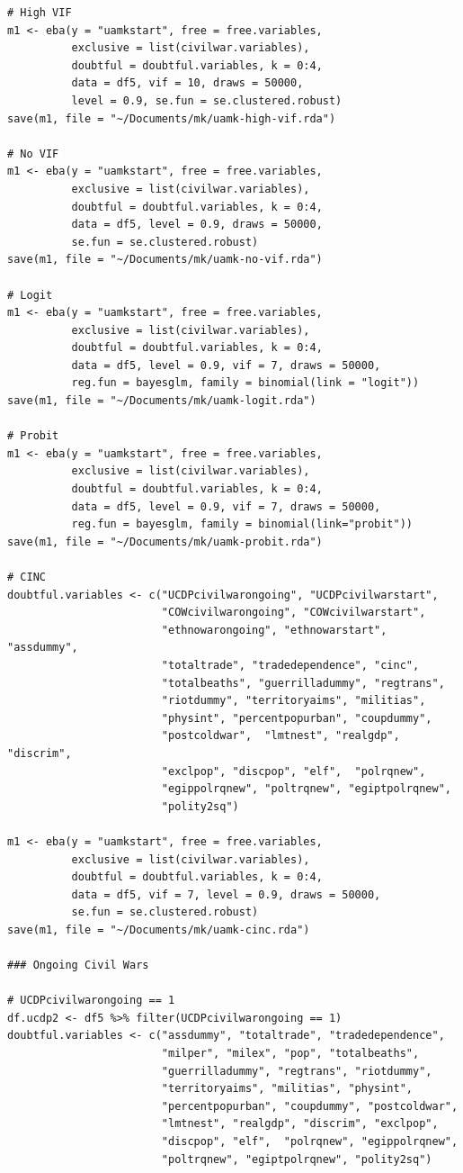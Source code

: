 \begin{verbatim}
# High VIF
m1 <- eba(y = "uamkstart", free = free.variables,
          exclusive = list(civilwar.variables),
          doubtful = doubtful.variables, k = 0:4,
          data = df5, vif = 10, draws = 50000,
          level = 0.9, se.fun = se.clustered.robust)
save(m1, file = "~/Documents/mk/uamk-high-vif.rda")

# No VIF
m1 <- eba(y = "uamkstart", free = free.variables,
          exclusive = list(civilwar.variables),
          doubtful = doubtful.variables, k = 0:4,
          data = df5, level = 0.9, draws = 50000,
          se.fun = se.clustered.robust)
save(m1, file = "~/Documents/mk/uamk-no-vif.rda")

# Logit
m1 <- eba(y = "uamkstart", free = free.variables,
          exclusive = list(civilwar.variables),
          doubtful = doubtful.variables, k = 0:4,
          data = df5, level = 0.9, vif = 7, draws = 50000,
          reg.fun = bayesglm, family = binomial(link = "logit"))
save(m1, file = "~/Documents/mk/uamk-logit.rda")

# Probit
m1 <- eba(y = "uamkstart", free = free.variables,
          exclusive = list(civilwar.variables),
          doubtful = doubtful.variables, k = 0:4,
          data = df5, level = 0.9, vif = 7, draws = 50000,
          reg.fun = bayesglm, family = binomial(link="probit"))
save(m1, file = "~/Documents/mk/uamk-probit.rda")

# CINC
doubtful.variables <- c("UCDPcivilwarongoing", "UCDPcivilwarstart",
                        "COWcivilwarongoing", "COWcivilwarstart",
                        "ethnowarongoing", "ethnowarstart", "assdummy",
                        "totaltrade", "tradedependence", "cinc",
                        "totalbeaths", "guerrilladummy", "regtrans",
                        "riotdummy", "territoryaims", "militias",
                        "physint", "percentpopurban", "coupdummy",
                        "postcoldwar",  "lmtnest", "realgdp", "discrim",
                        "exclpop", "discpop", "elf",  "polrqnew",
                        "egippolrqnew", "poltrqnew", "egiptpolrqnew",
                        "polity2sq")

m1 <- eba(y = "uamkstart", free = free.variables,
          exclusive = list(civilwar.variables),
          doubtful = doubtful.variables, k = 0:4,
          data = df5, vif = 7, level = 0.9, draws = 50000,
          se.fun = se.clustered.robust)
save(m1, file = "~/Documents/mk/uamk-cinc.rda")

### Ongoing Civil Wars

# UCDPcivilwarongoing == 1
df.ucdp2 <- df5 %>% filter(UCDPcivilwarongoing == 1)
doubtful.variables <- c("assdummy", "totaltrade", "tradedependence",
                        "milper", "milex", "pop", "totalbeaths",
                        "guerrilladummy", "regtrans", "riotdummy",
                        "territoryaims", "militias", "physint",
                        "percentpopurban", "coupdummy", "postcoldwar",
                        "lmtnest", "realgdp", "discrim", "exclpop",
                        "discpop", "elf",  "polrqnew", "egippolrqnew",
                        "poltrqnew", "egiptpolrqnew", "polity2sq")


\end{verbatim}
